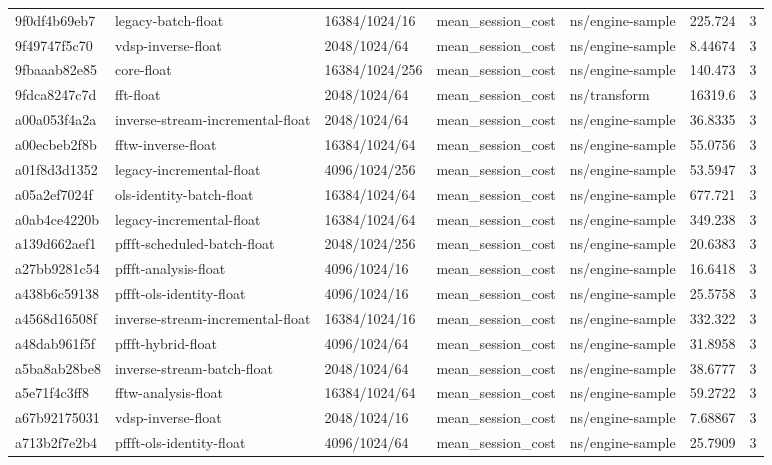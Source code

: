 \begin{longtable}{lllllrr}
9f0df4b69eb7 & legacy-batch-float & 16384/1024/16 & mean\_session\_cost & ns/engine-sample & 225.724 & 3 \\
9f49747f5c70 & vdsp-inverse-float & 2048/1024/64 & mean\_session\_cost & ns/engine-sample & 8.44674 & 3 \\
9fbaaab82e85 & core-float & 16384/1024/256 & mean\_session\_cost & ns/engine-sample & 140.473 & 3 \\
9fdca8247c7d & fft-float & 2048/1024/64 & mean\_session\_cost & ns/transform & 16319.6 & 3 \\
a00a053f4a2a & inverse-stream-incremental-float & 2048/1024/64 & mean\_session\_cost & ns/engine-sample & 36.8335 & 3 \\
a00ecbeb2f8b & fftw-inverse-float & 16384/1024/64 & mean\_session\_cost & ns/engine-sample & 55.0756 & 3 \\
a01f8d3d1352 & legacy-incremental-float & 4096/1024/256 & mean\_session\_cost & ns/engine-sample & 53.5947 & 3 \\
a05a2ef7024f & ols-identity-batch-float & 16384/1024/64 & mean\_session\_cost & ns/engine-sample & 677.721 & 3 \\
a0ab4ce4220b & legacy-incremental-float & 16384/1024/64 & mean\_session\_cost & ns/engine-sample & 349.238 & 3 \\
a139d662aef1 & pffft-scheduled-batch-float & 2048/1024/256 & mean\_session\_cost & ns/engine-sample & 20.6383 & 3 \\
a27bb9281c54 & pffft-analysis-float & 4096/1024/16 & mean\_session\_cost & ns/engine-sample & 16.6418 & 3 \\
a438b6c59138 & pffft-ols-identity-float & 4096/1024/16 & mean\_session\_cost & ns/engine-sample & 25.5758 & 3 \\
a4568d16508f & inverse-stream-incremental-float & 16384/1024/16 & mean\_session\_cost & ns/engine-sample & 332.322 & 3 \\
a48dab961f5f & pffft-hybrid-float & 4096/1024/64 & mean\_session\_cost & ns/engine-sample & 31.8958 & 3 \\
a5ba8ab28be8 & inverse-stream-batch-float & 2048/1024/64 & mean\_session\_cost & ns/engine-sample & 38.6777 & 3 \\
a5e71f4c3ff8 & fftw-analysis-float & 16384/1024/64 & mean\_session\_cost & ns/engine-sample & 59.2722 & 3 \\
a67b92175031 & vdsp-inverse-float & 2048/1024/16 & mean\_session\_cost & ns/engine-sample & 7.68867 & 3 \\
a713b2f7e2b4 & pffft-ols-identity-float & 4096/1024/64 & mean\_session\_cost & ns/engine-sample & 25.7909 & 3 \\

\end{longtable}
